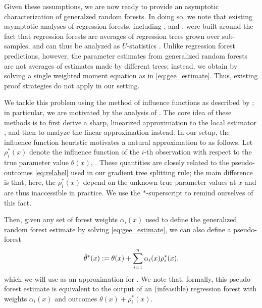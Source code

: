 \documentclass[aos]{imsart}
\theoremstyle{plain}
\theoremstyle{definition}
\theoremstyle{remark}
\begin{document}
\begin{CJK}{UTF8}{gbsn}
Given these assumptions, we are now ready to provide an asymptotic characterization
of generalzed random forests. In doing so, we note that existing asymptotic analyses of regression forests,
including \citet{mentch2016quantifying}, \citet{scornet2015consistency} and \citet{wager2015estimation},
were built around the fact that regression forests are averages of regression
trees grown over sub-samples, and can thus be analyzed as $U$-statistics \citep{hoeffding1948class}.
Unlike regression forest predictions, however, the parameter estimates 
from generalized random forests are not averages of estimates made by different trees;
instead, we obtain  by solving a single weighted moment equation
as in \eqref{eq:gee_estimate}. Thus, existing proof strategies do not apply in our setting.

We tackle this problem using the method of influence functions as described by \citet{hampel1974influence};
in particular, we are motivated by the analysis of \citet{newey1994kernel}. The core idea of these methods
is to first derive a sharp, linearized approximation to the local estimator , and
then to analyze the linear approximation instead.
In our setup, the influence function heuristic motivates a natural approximation 
to  as follows. Let $\rho_i^*(x)$ denote the influence function of the
$i$-th observation with respect to the true parameter value $\theta(x)$,
.
These quantities are closely related to the pseudo-outcomes \eqref{eq:relabel} used in our gradient tree
splitting rule; the main difference is that, here, the $\rho_i^*(x)$ depend on the unknown true
parameter values at $x$ and are thus inaccessible in practice. We use the $*$-superscript to remind ourselves
of this fact.

Then, given any set of forest weights $\alpha_i(x)$ used to define the generalized random forest
estimate  by solving \eqref{eq:gee_estimate}, we can also define a
pseudo-forest
\begin{equation}
\label{eq:pseudo_forest}
\ttheta^*(x) := \theta(x) + \sum_{i = 1}^n \alpha_i(x) \rho_i^*(x),
\end{equation}
which we will use as an approximation for  . We note that,
formally, this pseudo-forest estimate  is equivalent to the output of an (infeasible)
regression forest with weights $\alpha_i(x)$ and outcomes $\theta(x) + \rho_i^*(x)$.


\end{CJK}
\end{document}
